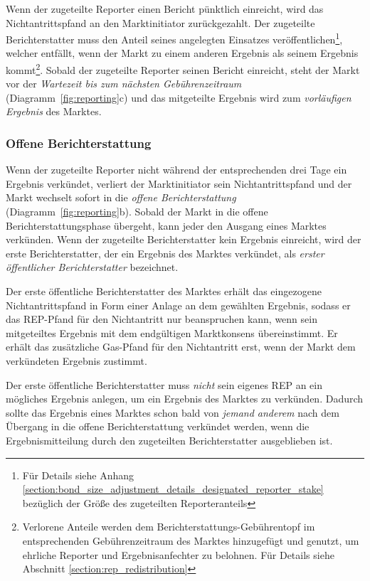 \documentclass[floatfix,reprint,nofootinbib,amsmath,amssymb,epsfig,pre,floats,letterpaper,groupedaffiliation]{revtex4-1}
\theoremstyle{definition}
\theoremstyle{definition}
\theoremstyle{definition}
\begin{document}
Wenn der zugeteilte Reporter einen Bericht pünktlich einreicht, wird das Nichtantrittspfand an den Marktinitiator zurückgezahlt. Der zugeteilte Berichterstatter muss den Anteil seines angelegten Einsatzes veröffentlichen\footnote{Für Details siehe Anhang \ref{section:bond_size_adjustment_details_designated_reporter_stake} bezüglich der Größe des zugeteilten Reporteranteils}, welcher entfällt, wenn der Markt zu einem anderen Ergebnis als seinem Ergebnis kommt\footnote{Verlorene Anteile werden dem Berichterstattungs-Gebührentopf im entsprechenden Gebührenzeitraum des Marktes hinzugefügt und genutzt, um ehrliche Reporter und Ergebnisanfechter zu belohnen. Für Details siehe Abschnitt \ref{section:rep_redistribution}}. Sobald der zugeteilte Reporter seinen Bericht einreicht, steht der Markt vor der \textit{Wartezeit bis zum nächsten Gebührenzeitraum} (Diagramm~\ref{fig:reporting}c) und das mitgeteilte Ergebnis wird zum \textit{vorläufigen Ergebnis} des Marktes.

\subsubsection{Offene Berichterstattung}\label{section:open_reporting}

Wenn der zugeteilte Reporter nicht während der entsprechenden drei Tage ein Ergebnis verkündet, verliert der Marktinitiator sein Nichtantrittspfand und der Markt wechselt sofort in die \textit{offene Berichterstattung} (Diagramm~\ref{fig:reporting}b). Sobald der Markt in die offene Berichterstattungsphase übergeht, kann jeder den Ausgang eines Marktes verkünden. Wenn der zugeteilte Berichterstatter kein Ergebnis einreicht, wird der erste Berichterstatter, der ein Ergebnis des Marktes verkündet, als \textit{erster öffentlicher Berichterstatter} bezeichnet.

Der erste öffentliche Berichterstatter des Marktes erhält das eingezogene Nichtantrittspfand in Form einer Anlage an dem gewählten Ergebnis, sodass er das REP-Pfand für den Nichtantritt nur beanspruchen kann, wenn sein mitgeteiltes Ergebnis mit dem endgültigen Marktkonsens übereinstimmt. Er erhält das zusätzliche Gas-Pfand für den Nichtantritt erst, wenn der Markt dem verkündeten Ergebnis zustimmt.

Der erste öffentliche Berichterstatter muss \textit{nicht} sein eigenes REP an ein mögliches Ergebnis anlegen, um ein Ergebnis des Marktes zu verkünden. Dadurch sollte das Ergebnis eines Marktes schon bald von \textit{jemand anderem} nach dem Übergang in die offene Berichterstattung verkündet werden, wenn die Ergebnismitteilung durch den zugeteilten Berichterstatter ausgeblieben ist.
\end{document}
